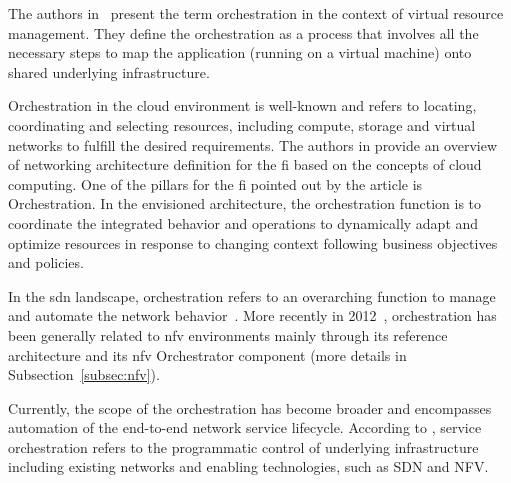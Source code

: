 The authors in~\cite{Grit2006} present the term orchestration in the context of virtual resource management. They define the orchestration as a process that involves all the necessary steps to map the application (running on a virtual machine) onto shared underlying infrastructure. 

Orchestration in the cloud environment is well-known and refers to locating, coordinating and selecting resources, including compute, storage and virtual networks to fulfill the desired requirements. The authors in \cite{Galis2009ManagementInternet} provide an overview of networking architecture definition for the \gls{fi} based on the concepts of cloud computing. One of the pillars for the \gls{fi} pointed out by the article is Orchestration. In the envisioned architecture, the orchestration function is to coordinate the integrated behavior and operations to dynamically adapt and optimize resources in response to changing context following business objectives and policies.

In the \gls{sdn} landscape, orchestration refers to an overarching function to manage and automate the network behavior~\cite{5984813}. %
 More recently in 2012~\cite{ETSI2012NetworkAction}, orchestration has been generally related to \gls{nfv} environments mainly through its reference architecture and its \gls{nfv} Orchestrator component (more details in Subsection~\ref{subsec:nfv}).  

Currently, the scope of the orchestration has become broader and encompasses automation of the end-to-end network service lifecycle. According to \cite{MEF:Third:2015}, service orchestration refers to the programmatic control of underlying infrastructure including existing networks and enabling technologies, such as SDN and NFV.



